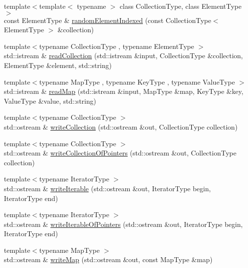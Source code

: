 \begin{DoxyCompactItemize}
\item 
{\footnotesize template$<$template$<$ typename $>$ class Collection\+Type, class Element\+Type $>$ }\\const Element\+Type \& \mbox{\hyperlink{namespacestanfordcpplib_1_1collections_acec813d0f7952ab557a897ffb0e4b430}{random\+Element\+Indexed}} (const Collection\+Type$<$ Element\+Type $>$ \&collection)
\item 
{\footnotesize template$<$typename Collection\+Type , typename Element\+Type $>$ }\\std\+::istream \& \mbox{\hyperlink{namespacestanfordcpplib_1_1collections_a367f8a5aa711274547c7b1628c3a42c6}{read\+Collection}} (std\+::istream \&input, Collection\+Type \&collection, Element\+Type \&element, std\+::string)
\item 
{\footnotesize template$<$typename Map\+Type , typename Key\+Type , typename Value\+Type $>$ }\\std\+::istream \& \mbox{\hyperlink{namespacestanfordcpplib_1_1collections_a7e92c7237edb0503f7a9a8666186dbf4}{read\+Map}} (std\+::istream \&input, Map\+Type \&map, Key\+Type \&key, Value\+Type \&value, std\+::string)
\item 
{\footnotesize template$<$typename Collection\+Type $>$ }\\std\+::ostream \& \mbox{\hyperlink{namespacestanfordcpplib_1_1collections_aa0fa77893be51108c73f38f0baf30a02}{write\+Collection}} (std\+::ostream \&out, Collection\+Type collection)
\item 
{\footnotesize template$<$typename Collection\+Type $>$ }\\std\+::ostream \& \mbox{\hyperlink{namespacestanfordcpplib_1_1collections_a0476c2f41f266287172ae36ba9a66266}{write\+Collection\+Of\+Pointers}} (std\+::ostream \&out, Collection\+Type collection)
\item 
{\footnotesize template$<$typename Iterator\+Type $>$ }\\std\+::ostream \& \mbox{\hyperlink{namespacestanfordcpplib_1_1collections_ad5dc1381a951235f3246d586de1bffb9}{write\+Iterable}} (std\+::ostream \&out, Iterator\+Type begin, Iterator\+Type end)
\item 
{\footnotesize template$<$typename Iterator\+Type $>$ }\\std\+::ostream \& \mbox{\hyperlink{namespacestanfordcpplib_1_1collections_a8e61f75a91cbd6dc48440214b8ea509d}{write\+Iterable\+Of\+Pointers}} (std\+::ostream \&out, Iterator\+Type begin, Iterator\+Type end)
\item 
{\footnotesize template$<$typename Map\+Type $>$ }\\std\+::ostream \& \mbox{\hyperlink{namespacestanfordcpplib_1_1collections_a76ae42d89473ff4e20eef94f8bd6d942}{write\+Map}} (std\+::ostream \&out, const Map\+Type \&map)
\end{DoxyCompactItemize}


